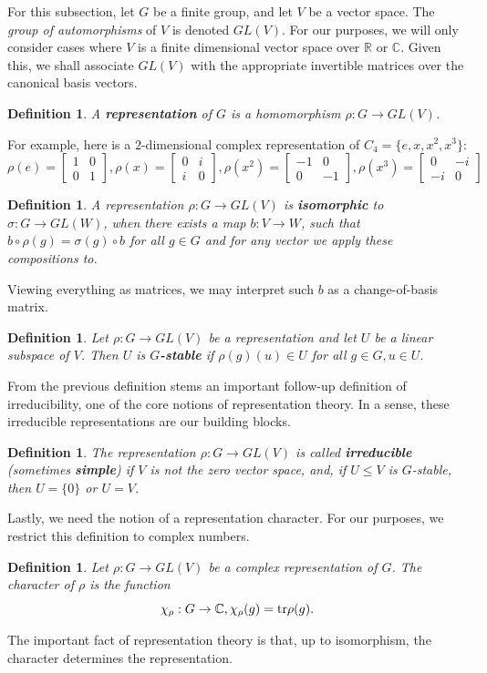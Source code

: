 \documentclass[11pt]{article}
\newtheorem{definition}[theorem]{Definition}
\begin{document}
For this subsection, let $G$ be a finite group, and let $V$ be a vector space.
The \textit{group of automorphisms} of $V$ is denoted $GL(V)$. For our purposes,
we will only consider cases where $V$ is a finite dimensional vector space over
$\mathbb{R}$ or $\mathbb{C}$. Given this, we shall associate $GL(V)$ with the
appropriate invertible matrices over the canonical basis vectors.
\begin{definition}
  A \textbf{representation} of $G$ is a homomorphism $\rho: G \rightarrow GL(V)$.
\end{definition}
For example, here is a $2$-dimensional complex representation of
$C_4 = \{e, x, x^2, x^3\}$:
\[\rho(e) = \begin{bmatrix}
  1 & 0 \\ 0 & 1
\end{bmatrix}, \rho(x) = \begin{bmatrix}
  0 & i \\ i & 0
\end{bmatrix}, \rho(x^2) = \begin{bmatrix}
  -1 & 0 \\ 0 & -1
\end{bmatrix}, \rho(x^3) = \begin{bmatrix}
  0 & -i \\ -i & 0
\end{bmatrix}\]
\doublespacing
\begin{definition} \label{def:rep_iso}
  A representation $\rho: G \rightarrow GL(V)$ is \textbf{isomorphic} to
  $\sigma: G \rightarrow GL(W)$, when there exists a map $b: V \rightarrow W$,
  such that $b \circ \rho(g) = \sigma(g) \circ b$ for all $g \in G$ and for any
  vector we apply these compositions to.
\end{definition}
Viewing everything as matrices, we may interpret such $b$ as a change-of-basis matrix.
\begin{definition}
  Let $\rho: G \rightarrow GL(V)$ be a representation and let $U$ be a linear subspace of $V$.
  Then $U$ is \textbf{$G$-stable} if $\rho(g)(u) \in U$ for all $g \in G, u \in U$.
\end{definition}
From the previous definition stems an important follow-up definition of irreducibility, one of the
core notions of representation theory. In a sense, these irreducible representations are our building blocks.
\begin{definition}
  The representation $\rho: G \rightarrow GL(V)$ is called \textbf{irreducible} (sometimes \textbf{simple}) if
  $V$ is not the zero vector space, and, if $U \leq V$ is $G$-stable, then $U = \{0\}$ or $U = V$.
\end{definition}
Lastly, we need the notion of a representation character. For our purposes, we restrict this definition to complex numbers.
\begin{definition}
  Let $\rho: G \rightarrow GL(V)$ be a complex representation of $G$. The character of $\rho$ is the function
  \[\chi_\rho: G \rightarrow \mathbb{C}, \chi_\rho(g) = \textnormal{tr} \rho(g).\]
\end{definition}
The important fact of representation theory is that, up to isomorphism, the character determines the representation.
\end{document}

